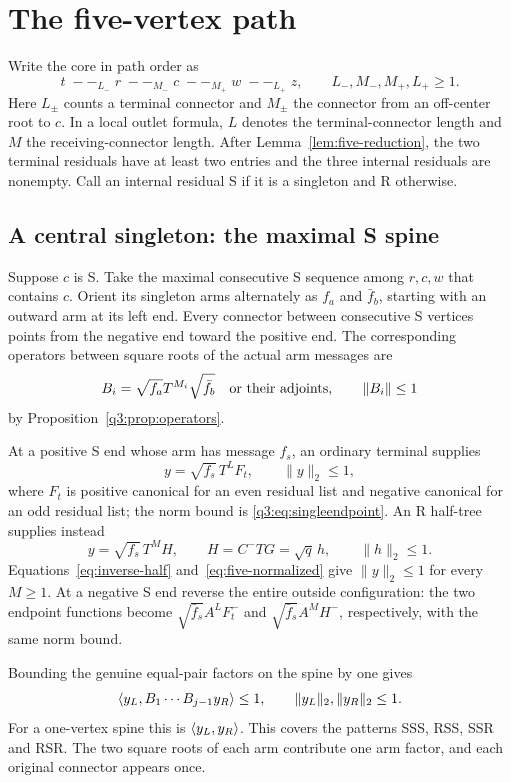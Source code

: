 \section{The five-vertex path}\label{sec:five-chain}
Write the core in path order as
\[
 t\;--_{L_-}\;r\;--_{M_-}\;c\;--_{M_+}\;w\;--_{L_+}\;z,
 \qquad L_-,M_-,M_+,L_+\ge1.
\]
Here $L_\pm$ counts a terminal connector and $M_\pm$ the connector
from an off-center root to $c$. In a local outlet formula, $L$ denotes
the terminal-connector length and $M$ the receiving-connector length.
After Lemma~\ref{lem:five-reduction}, the two terminal residuals have
at least two entries and the three internal residuals are nonempty.
Call an internal residual S if it is a singleton and R otherwise.

\subsection{A central singleton: the maximal S spine}
Suppose $c$ is S. Take the maximal consecutive S sequence among
$r,c,w$ that contains $c$. Orient its singleton arms alternately as
$f_a$ and $\bar f_b$, starting with an outward arm at its left end.
Every connector between consecutive S vertices points from the
negative end toward the positive end. The corresponding operators
between square roots of the actual arm messages are
\[
 B_i=\sqrt{f_a}T^{M_i}\sqrt{\bar f_b}
 \quad\hbox{or their adjoints},\qquad \|B_i\|\le1
\]
by Proposition~\ref{q3:prop:operators}.

At a positive S end whose arm has message \(f_s\), an ordinary
terminal supplies
\[
 y=\sqrt{f_s}\,T^LF_t,\qquad \|y\|_2\le1,
\]
where \(F_t\) is positive canonical for an even residual list and
negative canonical for an odd residual list; the norm bound is
\eqref{q3:eq:singleendpoint}. An R half-tree supplies instead
\[
 y=\sqrt{f_s}\,T^MH,\qquad
 H=C^-TG=\sqrt q\,h,\qquad \|h\|_2\le1.
\]
Equations~\eqref{eq:inverse-half} and~\eqref{eq:five-normalized}
give \(\|y\|_2\le1\) for every \(M\ge1\).
At a negative S end reverse the entire outside configuration:
the two endpoint functions become
\(\sqrt{\bar f_s}A^LF_t^-\) and
\(\sqrt{\bar f_s}A^MH^-\), respectively, with the same norm bound.

Bounding the genuine equal-pair factors on the spine by one gives
\[
 \left\langle y_L,B_1\cdots B_{j-1}y_R\right\rangle\le1,
 \qquad \|y_L\|_2,\|y_R\|_2\le1.
\]
For a one-vertex spine this is $\left\langle y_L,y_R\right\rangle$. This covers the patterns SSS, RSS,
SSR and RSR. The two square roots of each arm contribute one arm factor, and each
original connector appears once.

